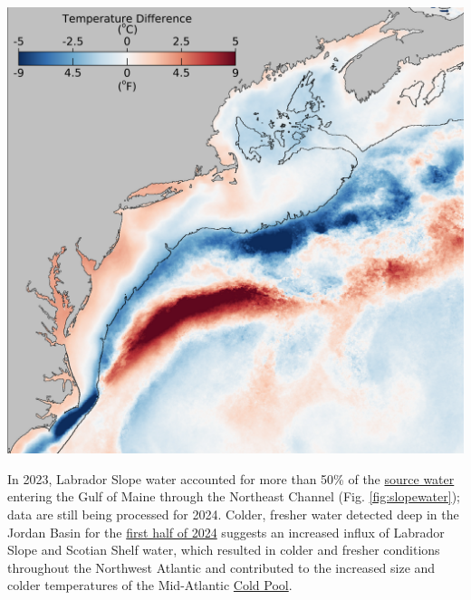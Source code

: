 \documentclass[
  10pt,
]{article}
\let\origfigure\figure
\let\endorigfigure\endfigure
\renewenvironment{figure}[1][2] {
    \expandafter\origfigure\expandafter[H]
} {
    \endorigfigure
}
\begin{document}
\begin{figure}

{\centering \includegraphics[width=0.65\linewidth]{midatlantic_files/figure-latex/slopesea-1} 

}

\caption{February 2024 sea surface temperature difference compared to the February 2000-2020 long-term mean from the NOAA Advanced Clear-Sky Processor for Ocean (ACSPO) Super-collated SST.}\label{fig:slopesea}
\end{figure}

In 2023, Labrador Slope water accounted for more than 50\% of the \href{https://noaa-edab.github.io/catalog/slopewater.html}{source water} entering the Gulf of Maine through the Northeast Channel (Fig. \ref{fig:slopewater}); data are still being processed for 2024. Colder, fresher water detected deep in the Jordan Basin for the \href{https://noaa-edab.github.io/catalog/observation_synthesis_2024.html}{first half of 2024} suggests an increased influx of Labrador Slope and Scotian Shelf water, which resulted in colder and fresher conditions throughout the Northwest Atlantic and contributed to the increased size and colder temperatures of the Mid-Atlantic \href{https://noaa-edab.github.io/catalog/cold_pool.html}{Cold Pool}.
\end{document}
